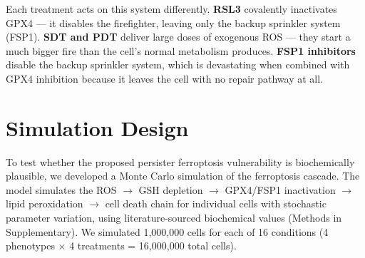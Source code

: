 \documentclass[11pt,twoside,openright]{report}
\begin{document}
Each treatment acts on this system differently. \textbf{RSL3} covalently inactivates GPX4 --- it disables the firefighter, leaving only the backup sprinkler system (FSP1). \textbf{SDT and PDT} deliver large doses of exogenous ROS --- they start a much bigger fire than the cell's normal metabolism produces. \textbf{FSP1 inhibitors} disable the backup sprinkler system, which is devastating when combined with GPX4 inhibition because it leaves the cell with no repair pathway at all.

\section{Simulation Design}

To test whether the proposed persister ferroptosis vulnerability is biochemically plausible, we developed a Monte Carlo simulation of the ferroptosis cascade. The model simulates the ROS $\rightarrow$ GSH depletion $\rightarrow$ GPX4/FSP1 inactivation $\rightarrow$ lipid peroxidation $\rightarrow$ cell death chain for individual cells with stochastic parameter variation, using literature-sourced biochemical values (Methods in Supplementary). We simulated 1,000,000 cells for each of 16 conditions (4 phenotypes $\times$ 4 treatments = 16,000,000 total cells).
\end{document}
